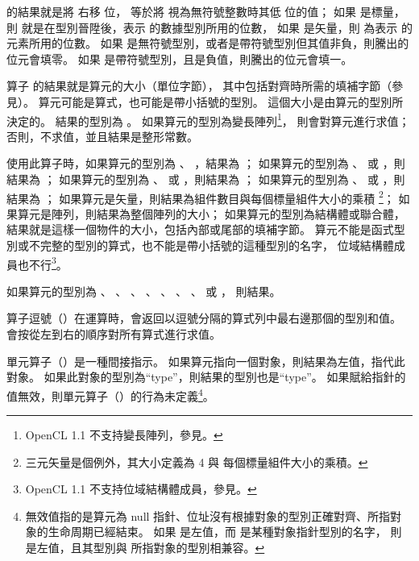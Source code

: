 { 的結果就是將  右移  位，
  等於將  視為無符號整數時其低  位的值；
如果  是標量，則  就是在型別晉陞後，表示  的數據型別所用的位數，
如果  是矢量，則  為表示  的元素所用的位數。
如果  是無符號型別，或者是帶符號型別但其值非負，則騰出的位元會填零。
如果  是帶符號型別，且是負值，則騰出的位元會填一。
\stopitem

\startitem
算子  的結果就是算元的大小（單位字節），
其中包括對齊時所需的填補字節（參見）。
算元可能是算式，也可能是帶小括號的型別。
這個大小是由算元的型別所決定的。
結果的型別為 。
如果算元的型別為變長陣列\footnote{OpenCL 1.1 不支持變長陣列，參見。}，
則會對算元進行求值；
否則，不求值，並且結果是整形常數。

使用此算子時，如果算元的型別為 、 ，結果為 ；
如果算元的型別為 、  或 ，則結果為 ；
如果算元的型別為 、  或 ，則結果為 ；
如果算元的型別為 、  或 ，則結果為 ；
如果算元是矢量，則結果為組件數目與每個標量組件大小的乘積
\footnote{三元矢量是個例外，其大小定義為 4 與 每個標量組件大小的乘積。}；
如果算元是陣列，則結果為整個陣列的大小；
如果算元的型別為結構體或聯合體，結果就是這樣一個物件的大小，包括內部或尾部的填補字節。
算元不能是函式型別或不完整的型別的算式，也不能是帶小括號的這種型別的名字，
位域結構體成員也不行\footnote{OpenCL 1.1 不支持位域結構體成員，參見。}。

如果算元的型別為 、 、 、
 、 、 、
 、  或 ，
則結果。
\stopitem

\startitem
算子逗號（\ccmm{,}）在運算時，會返回以逗號分隔的算式列中最右邊那個的型別和值。
會按從左到右的順序對所有算式進行求值。
\stopitem

\startitem
單元算子（\ccmm{*}）是一種間接指示。
如果算元指向一個對象，則結果為左值，指代此對象。
如果此對象的型別為“type”，則結果的型別也是“type”。
如果賦給指針的值無效，則單元算子（\ccmm{*}）的行為未定義\footnote{
無效值指的是算元為 null 指針、位址沒有根據對象的型別正確對齊、所指對象的生命周期已經結束。
如果  是左值，而  是某種對象指針型別的名字，
則  是左值，且其型別與  所指對象的型別相兼容。
}。
\stopitem

}
